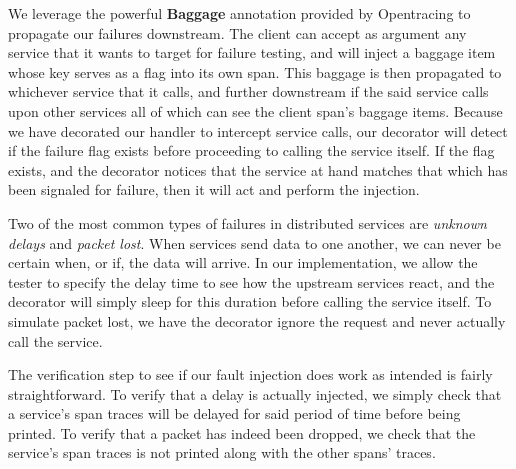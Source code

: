 We leverage the powerful \textbf{Baggage} annotation provided by Opentracing to propagate our failures downstream. The client can accept as argument any service that it wants to target for failure testing, and will inject a baggage item whose key serves as a flag into its own span. This baggage is then propagated to whichever service that it calls, and further downstream if the said service calls upon other services all of which can see the client span's baggage items. Because we have decorated our handler to intercept service calls, our decorator will detect if the failure flag exists before proceeding to calling the service itself. If the flag exists, and the decorator notices that the service at hand matches that which has been signaled for failure, then it will act and perform the injection. 

Two of the most common types of failures in distributed services are \textit{unknown delays} and \textit{packet lost}. When services send data to one another, we can never be certain when, or if, the data will arrive. In our implementation, we allow the tester to specify the delay time to see how the upstream services react, and the decorator will simply sleep for this duration before calling the service itself. To simulate packet lost, we have the decorator ignore the request and never actually call the service. 

The verification step to see if our fault injection does work as intended is fairly straightforward. To verify that a delay is actually injected, we simply check that a service's span traces will be delayed for said period of time before being printed. To verify that a packet has indeed been dropped, we check that the service's span traces is not printed along with the other spans' traces.


